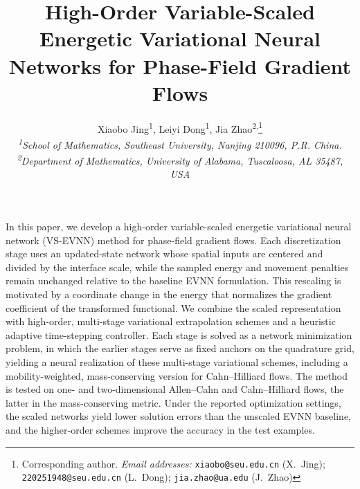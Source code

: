 \documentclass[11pt,letterpaper]{article}
\makeatletter
\theoremstyle{plain}
\theoremstyle{definition}
\renewenvironment{abstract}{%
  \normalfont\small
  \list{}{\labelwidth\z@
    \leftmargin4pc
    \itemindent\z@
    \parsep\z@ \@plus\p@
  }%
  \item[\hskip\labelsep\bfseries\abstractname.]%
}{%
  \endlist
}
\makeatother
\begin{document}
\raggedbottom

\title{High-Order Variable-Scaled Energetic Variational Neural Networks for Phase-Field Gradient Flows}

\author{%
  Xiaobo Jing\textsuperscript{1},\quad
  Leiyi Dong\textsuperscript{1},\quad
  Jia Zhao\textsuperscript{2,}\thanks{Corresponding author.
    \textit{Email addresses:} \texttt{xiaobo@seu.edu.cn} (X.~Jing);
    \texttt{220251948@seu.edu.cn} (L.~Dong);
    \texttt{jia.zhao@ua.edu} (J.~Zhao)}%
  \\[6pt]
  \normalsize\itshape
  \textsuperscript{1}School of Mathematics, Southeast University, Nanjing 210096, P.R. China.\\
  \normalsize\itshape
  \textsuperscript{2}Department of Mathematics, University of Alabama, Tuscaloosa, AL 35487, USA
}
\date{}

\maketitle
\thispagestyle{empty}

\noindent\hrulefill
\begin{abstract}
In this paper, we develop a high-order variable-scaled energetic variational neural network (VS-EVNN) method for phase-field gradient flows. Each discretization stage uses an updated-state network whose spatial inputs are centered and divided by the interface scale, while the sampled energy and movement penalties remain unchanged relative to the baseline EVNN formulation. This rescaling is motivated by a coordinate change in the energy that normalizes the gradient coefficient of the transformed functional. We combine the scaled representation with high-order, multi-stage variational extrapolation schemes and a heuristic adaptive time-stepping controller. Each stage is solved as a network minimization problem, in which the earlier stages serve as fixed anchors on the quadrature grid, yielding a neural realization of these multi-stage variational schemes, including a mobility-weighted, mass-conserving version for Cahn--Hilliard flows. The method is tested on one- and two-dimensional Allen--Cahn and Cahn--Hilliard flows, the latter in the mass-conserving metric. Under the reported optimization settings, the scaled networks yield lower solution errors than the unscaled EVNN baseline, and the higher-order schemes improve the accuracy in the test examples.
\end{abstract}

\vspace{-6pt}
\end{document}
